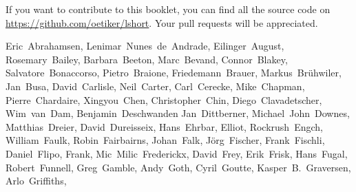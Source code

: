 If you want to contribute to this booklet, you can find all the source code
on \url{https://github.com/oetiker/lshort}. Your pull requests will be
appreciated.

\begin{flushleft}
\small
Eric~Abrahamsen,        %
Lenimar~Nunes~de~Andrade, %
Eilinger~August,        %
Rosemary~Bailey,        %
Barbara~Beeton,         %
Marc~Bevand,            %
Connor~Blakey,          %
Salvatore~Bonaccorso,   %
Pietro~Braione,         %
Friedemann~Brauer,      %
Markus~Br\"uhwiler,     %
Jan~Busa,               %
David~Carlisle,         %
Neil~Carter,            %
Carl~Cerecke,           %
Mike~Chapman,           %
Pierre~Chardaire,       %
Xingyou~Chen,           %
Christopher~Chin,       %
Diego~Clavadetscher,    %
Wim~van~Dam,            %
Benjamin~Deschwanden    %
Jan~Dittberner,         %
Michael~John~Downes,    %
Matthias~Dreier,        %
David~Dureisseix,       %
Hans~Ehrbar,            %
Elliot,                 %
Rockrush~Engch,         %
William~Faulk,          %
Robin~Fairbairns,       %
Johan~Falk,             %
J\"org~Fischer,         %
Frank~Fischli,          %
Daniel~Flipo,           %
Frank,                  %
Mic~Milic~Frederickx,   %
David~Frey,             %
Erik~Frisk,             %
Hans~Fugal,             %
Robert~Funnell,         %
Greg~Gamble,            %
Andy~Goth,              %
Cyril~Goutte,           %
Kasper~B.~Graversen,    %
Arlo~Griffiths,         %

\end{flushleft}

